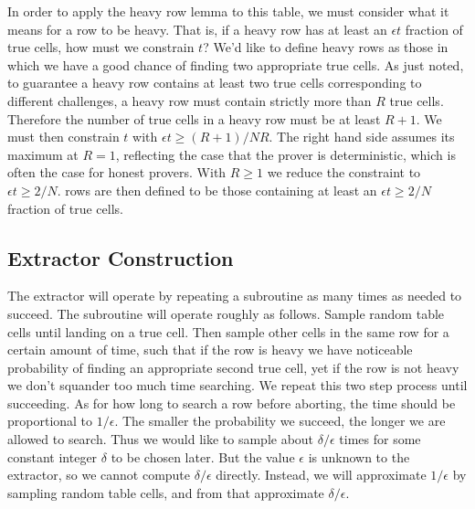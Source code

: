 In order to apply the heavy row lemma to this table, we must consider what it means for a row to be heavy.
That is, if a heavy row has at least an $\epsilon t$ fraction of true cells, how must we constrain $t$?
We'd like to define heavy rows as those in which we have a good chance of finding two appropriate true cells.
As just noted, to guarantee a heavy row contains at least two true cells corresponding to different challenges, a heavy row must contain strictly more than $R$ true cells.
Therefore the number of true cells in a heavy row must be at least $R+1$.
We must then constrain $t$ with $\epsilon t \geq (R+1)/NR$.
The right hand side assumes its maximum at $R=1$, reflecting the case that the prover is deterministic, which is often the case for honest provers.
With $R \geq 1$ we reduce the constraint to $\epsilon t \geq 2/N$.
 rows are then defined to be those containing at least an $\epsilon t \geq 2/N$ fraction of true cells.


\subsection{Extractor Construction}

The extractor will operate by repeating a subroutine as many times as needed to succeed.
The subroutine will operate roughly as follows.
Sample random table cells until landing on a true cell.
Then sample other cells in the same row for a certain amount of time, such that if the row is heavy we have noticeable probability of finding an appropriate second true cell, yet if the row is not heavy we don't squander too much time searching.
We repeat this two step process until succeeding.
As for how long to search a row before aborting, the time should be proportional to $1/\epsilon$.
The smaller the probability we succeed, the longer we are allowed to search.
Thus we would like to sample about $\delta/\epsilon$ times for some constant integer $\delta$ to be chosen later.
But the value $\epsilon$ is unknown to the extractor, so we cannot compute $\delta/\epsilon$ directly.
Instead, we will approximate $1/\epsilon$ by sampling random table cells, and from that approximate $\delta/\epsilon$.

